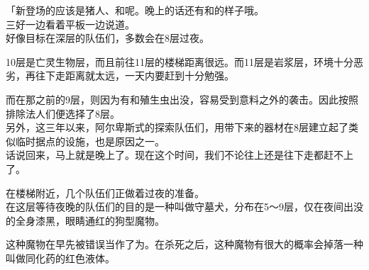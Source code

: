 「新登场的应该是猪人、和呢。晚上的话还有和的样子哦。\\

三好一边看着平板一边说道。\\

好像目标在深层的队伍们，多数会在8层过夜。

10层是亡灵生物层，而且前往11层的楼梯距离很远。而11层是岩浆层，环境十分恶劣，再往下走距离就太远，一天内要赶到十分勉强。

而在那之前的9层，则因为有和殖生虫出没，容易受到意料之外的袭击。因此按照排除法人们便选择了8层。\\

另外，这三年以来，阿尔卑斯式的探索队伍们，用带下来的器材在8层建立起了类似临时据点的设施，也是原因之一。\\

话说回来，马上就是晚上了。现在这个时间，我们不论往上还是往下走都赶不上了。

在楼梯附近，几个队伍们正做着过夜的准备。\\

在这层等待夜晚的队伍们的目的是一种叫做守墓犬，分布在5～9层，仅在夜间出没的全身漆黑，眼睛通红的狗型魔物。

这种魔物在早先被错误当作了为。在杀死之后，这种魔物有很大的概率会掉落一种叫做同化药的红色液体。

